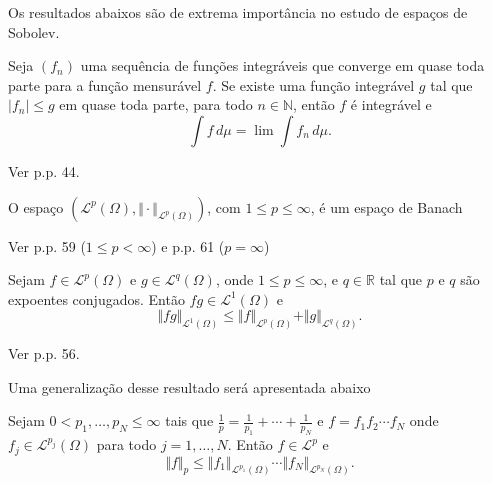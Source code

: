 \documentclass[a4paper, 11pt]{book}
\theoremstyle{definition}
\newcommand{\bN}{\mathbb{N}}
\newcommand{\bR}{\mathbb{R}}
\newcommand{\cL}{\mathcal{L}}
\begin{document}
Os resultados abaixos são de extrema importância no estudo de espaços de Sobolev.

\begin{tbox} \label{thm:teorema-da-convergencia-dominada}
    Seja $(f_n)$ uma sequência de funções integráveis que converge em quase toda parte para a função mensurável $f$.
    Se existe uma função integrável $g$ tal que $|f_n| \leqslant g$ em quase toda parte, para todo $n \in \bN$, então $f$ é integrável e
    \[
        \int f \,d\mu = \lim \int f_n \,d\mu.
    \]
\end{tbox}
\begin{prf}
    Ver \cite{bartle-measure.theory} p.p. 44.
\end{prf}

\begin{tbox} \label{thm:lp-completo-pre}
    O espaço $(\cL^p(\Omega), \Vert \cdot \Vert_{\cL^p(\Omega)})$, com $1 \leqslant p \leqslant \infty$, é um espaço de Banach\footnotemark
\end{tbox}
\begin{prf}
    Ver \cite{bartle-measure.theory} p.p. 59 ($1 \leqslant p < \infty$) e p.p. 61 ($p = \infty$)
\end{prf}


\begin{tbox} \label{thm:pre-desigualdade-de-holder}
    Sejam $f \in \cL^p(\Omega)$ e $g \in \cL^q(\Omega)$, onde $1 \leqslant p \leqslant \infty$, e $q \in \bR$ tal que $p$ e $q$ são expoentes conjugados\footnotemark.
    Então $fg \in \cL^1(\Omega)$ e
    \[
        \Vert fg \Vert_{\cL^1(\Omega)} \leqslant \Vert f \Vert_{\cL^p(\Omega)} + \Vert g \Vert_{\cL^q(\Omega)}.
    \]
\end{tbox}
\begin{prf}
    Ver \cite{bartle-measure.theory} p.p. 56.
\end{prf}


Uma generalização desse resultado será apresentada abaixo

\begin{tbox} \label{thm:pre-desigualdade-de-holder-gen}
    Sejam $0 < p_1,\dots,p_N \leqslant \infty$ tais que $\frac{1}{p} = \frac{1}{p_1} + \cdots + \frac{1}{p_N}$ e $f = f_1 f_2 \cdots f_N$ onde $f_j \in \cL^{p_j}(\Omega)$ para todo $j = 1,\dots,N$. 
    Então $f \in \cL^p$ e 
    \[
        \Vert f \Vert_p \leqslant \Vert f_1 \Vert_{\cL^{p_1}(\Omega)} \cdots \Vert f_N \Vert_{\cL^{p_N}(\Omega)}.
    \] 
\end{tbox}
\begin{prf}
    
\end{prf}
\end{document}
